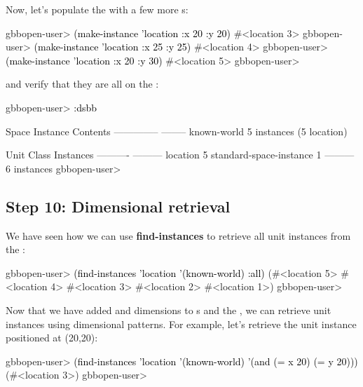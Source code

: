 \documentclass[10pt,twoside,english,pdftex]{article}
\begin{document}
%
%
Now, let's populate the  with a few more s:
%
\W\supp
\begin{example}
\textcolor{darkergray}{%
  gbbopen-user> \textcolor{black}{(make-instance 'location :x 20 :y 20)}
  #<location 3>
  gbbopen-user> \textcolor{black}{(make-instance 'location :x 25 :y 25)}
  #<location 4>
  gbbopen-user> \textcolor{black}{(make-instance 'location :x 20 :y 30)}
  #<location 5>
  gbbopen-user>}
\end{example}
%
%
%
and verify that they are all on the :
%
\W\supp\notpretop
\begin{example}
\textcolor{darkergray}{%
  gbbopen-user> \textcolor{black}{:dsbb}
  
  Space Instance                Contents
  --------------                --------
  known-world                   5 instances (5 location)

  Unit Class                    Instances
  ----------                    ---------
  location                              5
  standard-space-instance               1
                                ---------
                                        6 instances
  gbbopen-user>}
\end{example}

\subsection*{Step 10: Dimensional retrieval}

%
%
We have seen how we can use \textbf{find-instances} to retrieve all
 unit instances from the :
%
\W\supp
\begin{example}
\textcolor{darkergray}{%
  gbbopen-user> \textcolor{black}{(find-instances 'location '(known-world) :all)}
  (#<location 5> #<location 4> #<location 3> #<location 2> #<location 1>)
  gbbopen-user>}
\end{example}

Now that we have added  and  dimensions to s
and the , we can retrieve  unit instances
using dimensional patterns.  For example, let's retrieve the unit instance
positioned at (20,20):
%
\W\supp
\begin{example}
\textcolor{darkergray}{%
  gbbopen-user> \textcolor{black}{(find-instances 'location '(known-world)
                  '(and (= x 20) (= y 20)))}
   (#<location 3>)
  gbbopen-user>}
\end{example}
\end{document}
